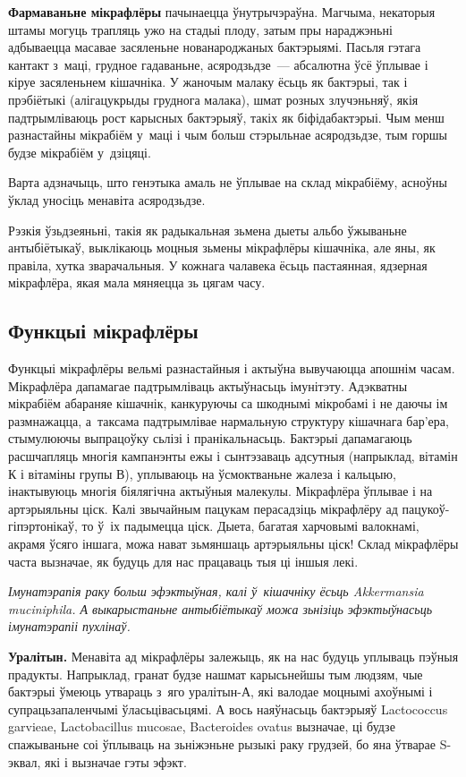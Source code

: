 \textbf{Фармаваньне мікрафлёры} пачынаецца ўнутрычэраўна. Магчыма, некаторыя штамы могуць трапляць ужо на стадыі плоду, затым пры нараджэньні адбываецца масавае засяленьне нованароджаных бактэрыямі. Пасьля гэтага кантакт з~маці, грудное гадаваньне, асяродзьдзе~--- абсалютна ўсё ўплывае і кіруе засяленьнем кішачніка. У жаночым малаку ёсьць як бактэрыі, так і прэбіётыкі (алігацукрыды груднога малака), шмат розных злучэньняў, якія падтрымліваюць рост карысных бактэрыяў, такіх як біфідабактэрыі. Чым менш разнастайны мікрабіём у~маці і чым больш стэрыльнае асяродзьдзе, тым горшы будзе мікрабіём у~дзіцяці.

Варта адзначыць, што генэтыка амаль не ўплывае на склад мікрабіёму, асноўны ўклад уносіць менавіта асяродзьдзе. 

Рэзкія ўзьдзеяньні, такія як радыкальная зьмена дыеты альбо ўжываньне антыбіётыкаў, выклікаюць моцныя зьмены мікрафлёры кішачніка, але яны, як правіла, хутка зварачальныя. У кожнага чалавека ёсьць пастаянная, ядзерная мікрафлёра, якая мала мяняецца зь цягам часу.

\subsection*{Функцыі мікрафлёры}

Функцыі мікрафлёры вельмі разнастайныя і актыўна вывучаюцца апошнім часам. Мікрафлёра дапамагае падтрымліваць актыўнасьць імунітэту. Адэкватны мікрабіём абараняе кішачнік, канкуруючы са шкоднымі мікробамі і не даючы ім размнажацца, а~таксама падтрымлівае нармальную структуру кішачнага бар'ера, стымулюючы выпрацоўку сьлізі і пранікальнасьць. Бактэрыі дапамагаюць расшчапляць многія кампанэнты ежы і сынтэзаваць адсутныя (напрыклад, вітамін К і вітаміны групы В), уплываюць на ўсмоктваньне жалеза і кальцыю, інактывуюць многія біялягічна актыўныя малекулы. Мікрафлёра ўплывае і на артэрыяльны ціск. Калі звычайным пацукам перасадзіць мікрафлёру ад пацукоў-гіпэртонікаў, то ў~іх падымецца ціск. Дыета, багатая харчовымі валокнамі, акрамя ўсяго іншага, можа нават зьмяншаць артэрыяльны ціск! Склад мікрафлёры часта вызначае, як будуць для нас працаваць тыя ці іншыя лекі. 

\emph{Імунатэрапія раку больш эфэктыўная, калі ў~кішачніку ёсьць Akkermansia muciniphila. А выкарыстаньне антыбіётыкаў можа зьнізіць эфэктыўнасьць імунатэрапіі пухлінаў.}

\textbf{Уралітын.} Менавіта ад мікрафлёры залежыць, як на нас будуць уплываць пэўныя прадукты. Напрыклад, гранат будзе нашмат карысьнейшы тым людзям, чые бактэрыі ўмеюць утвараць з~яго уралітын-А, які валодае моцнымі ахоўнымі і супрацьзапаленчымі ўласьцівасьцямі. А вось наяўнасьць бактэрыяў Lactococcus garvieae, Lactobacillus mucosae, Bacteroides ovatus вызначае, ці будзе спажываньне соі ўплываць на зьніжэньне рызыкі раку грудзей, бо яна ўтварае S-эквал, які і вызначае гэты эфэкт.

